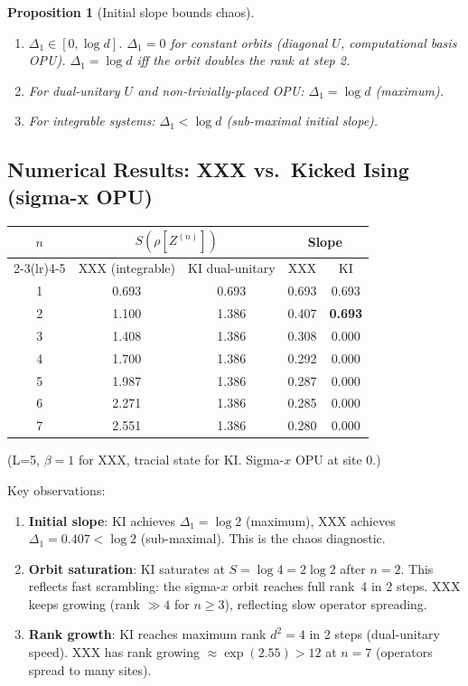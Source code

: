 \documentclass[12pt,a4paper]{article}
\newtheorem{proposition}[theorem]{Proposition}
\begin{document}
\begin{proposition}[Initial slope bounds chaos]\label{prop:initial_slope}
\begin{enumerate}
\item[(a)] $\Delta_1\in[0,\log d]$.  $\Delta_1=0$ for constant orbits (diagonal $U$,
  computational basis OPU).  $\Delta_1=\log d$ iff the orbit doubles the rank at step 2.
\item[(b)] For dual-unitary $U$ and non-trivially-placed OPU:
  $\Delta_1=\log d$ (maximum).
\item[(c)] For integrable systems: $\Delta_1<\log d$ (sub-maximal initial slope).
\end{enumerate}
\end{proposition}

\subsection{Numerical Results: XXX vs.\ Kicked Ising (sigma-x OPU)}

\begin{center}
\begin{tabular}{@{}ccccc@{}}
\toprule
$n$ & \multicolumn{2}{c}{$S(\rho[Z^{(n)}])$} & \multicolumn{2}{c}{Slope} \\
\cmidrule(lr){2-3}\cmidrule(lr){4-5}
 & XXX (integrable) & KI dual-unitary & XXX & KI \\
\midrule
1 & 0.693 & 0.693 & 0.693 & 0.693 \\
2 & 1.100 & 1.386 & 0.407 & \textbf{0.693} \\
3 & 1.408 & 1.386 & 0.308 & 0.000 \\
4 & 1.700 & 1.386 & 0.292 & 0.000 \\
5 & 1.987 & 1.386 & 0.287 & 0.000 \\
6 & 2.271 & 1.386 & 0.285 & 0.000 \\
7 & 2.551 & 1.386 & 0.280 & 0.000 \\
\bottomrule
\end{tabular}
\end{center}

\vspace{4pt}\noindent
(L=5, $\beta=1$ for XXX, tracial state for KI. Sigma-$x$ OPU at site 0.)

Key observations:
\begin{enumerate}
\item \textbf{Initial slope}: KI achieves $\Delta_1=\log 2$ (maximum), XXX achieves
  $\Delta_1=0.407<\log 2$ (sub-maximal).  This is the chaos diagnostic.
\item \textbf{Orbit saturation}: KI saturates at $S=\log 4=2\log 2$ after $n=2$.
  This reflects fast scrambling: the sigma-$x$ orbit reaches full rank~4 in 2 steps.
  XXX keeps growing (rank $\gg 4$ for $n\ge 3$), reflecting slow operator spreading.
\item \textbf{Rank growth}: KI reaches maximum rank $d^2=4$ in 2 steps (dual-unitary speed).
  XXX has rank growing $\approx \exp(2.55)>12$ at $n=7$ (operators spread to many sites).
\end{enumerate}
\end{document}
